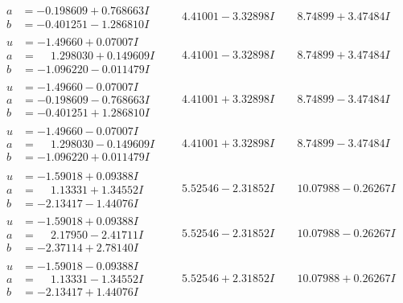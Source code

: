 \documentclass[1p]{elsarticle_modified}
\theoremstyle{definition}
\begin{document}
$$\begin{array}{c|c|c}
\begin{aligned}
a &= -0.198609 + 0.768663 I \\
b &= -0.401251 - 1.286810 I\end{aligned}
 & \phantom{-}4.41001 - 3.32898 I & \phantom{-}8.74899 + 3.47484 I \\ \hline\begin{aligned}
u &= -1.49660 + 0.07007 I \\
a &= \phantom{-}1.298030 + 0.149609 I \\
b &= -1.096220 - 0.011479 I\end{aligned}
 & \phantom{-}4.41001 - 3.32898 I & \phantom{-}8.74899 + 3.47484 I \\ \hline\begin{aligned}
u &= -1.49660 - 0.07007 I \\
a &= -0.198609 - 0.768663 I \\
b &= -0.401251 + 1.286810 I\end{aligned}
 & \phantom{-}4.41001 + 3.32898 I & \phantom{-}8.74899 - 3.47484 I \\ \hline\begin{aligned}
u &= -1.49660 - 0.07007 I \\
a &= \phantom{-}1.298030 - 0.149609 I \\
b &= -1.096220 + 0.011479 I\end{aligned}
 & \phantom{-}4.41001 + 3.32898 I & \phantom{-}8.74899 - 3.47484 I \\ \hline\begin{aligned}
u &= -1.59018 + 0.09388 I \\
a &= \phantom{-}1.13331 + 1.34552 I \\
b &= -2.13417 - 1.44076 I\end{aligned}
 & \phantom{-}5.52546 - 2.31852 I & \phantom{-}10.07988 - 0.26267 I \\ \hline\begin{aligned}
u &= -1.59018 + 0.09388 I \\
a &= \phantom{-}2.17950 - 2.41711 I \\
b &= -2.37114 + 2.78140 I\end{aligned}
 & \phantom{-}5.52546 - 2.31852 I & \phantom{-}10.07988 - 0.26267 I \\ \hline\begin{aligned}
u &= -1.59018 - 0.09388 I \\
a &= \phantom{-}1.13331 - 1.34552 I \\
b &= -2.13417 + 1.44076 I\end{aligned}
 & \phantom{-}5.52546 + 2.31852 I & \phantom{-}10.07988 + 0.26267 I \\ \hline\begin{aligned}

\end{aligned}
\end{array}$$
\end{document}
